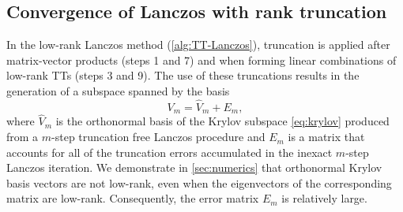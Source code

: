 \documentclass[10pt,preprint]{elsarticle}
\def\T{\mathfrak{T}}
\def\r{\bm r}
\begin{document}
\begin{appendices}

\subsection{Convergence of Lanczos with rank truncation}
In the low-rank Lanczos method (\cref{alg:TT-Lanczos}), truncation is applied after matrix-vector products (steps 1 and 7) and when forming linear combinations of low-rank TTs (steps 3 and 9). The use of these truncations results in the generation of a subspace spanned by the basis
\begin{equation}
V_m = \hat{V}_m + E_m,
\end{equation}
where $\hat{V}_m$ is the orthonormal basis of the Krylov subspace \eqref{eq:krylov} produced from a $m$-step truncation free Lanczos procedure and $E_m$ is a matrix that accounts for all of the truncation errors accumulated in the inexact $m$-step Lanczos iteration. We demonstrate in \cref{sec:numerics} that orthonormal Krylov basis vectors are not low-rank, even when the eigenvectors of the corresponding matrix are low-rank. Consequently, the error matrix $E_m$ is relatively large. 


\end{appendices}
\end{document}
